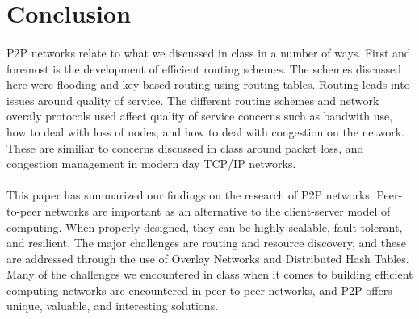 \documentclass[12pt,letterpaper]{article}
\begin{document}

\section{Conclusion}

\paragraph{}
P2P networks relate to what we discussed in class in a number of ways. 
First and foremost is the development of efficient routing schemes. 
The schemes discussed here were flooding and key-based routing using routing tables. 
Routing leads into issues around quality of service. 
The different routing schemes and network overaly protocols used affect quality of service concerns such as bandwith use, how to deal with loss of nodes, and how to deal with congestion on the network. 
These are similiar to concerns discussed in class around packet loss, and congestion management in modern day TCP/IP networks.

\paragraph{}
This paper has summarized our findings on the research of P2P networks. 
Peer-to-peer networks are important as an alternative to the client-server model of computing. 
When properly designed, they can be highly scalable, fault-tolerant, and resilient. 
The major challenges are routing and resource discovery, and these are addressed through the use of Overlay Networks and Distributed Hash Tables. 
Many of the challenges we encountered in class when it comes to building efficient computing networks are encountered in peer-to-peer networks, and P2P offers unique, valuable, and interesting solutions.



\end{document}
